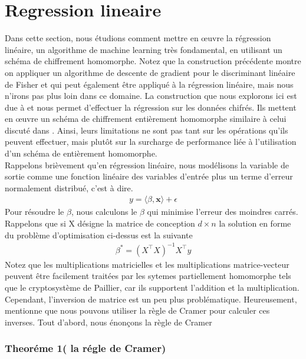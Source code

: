 \section{Regression lineaire}
Dans cette section, nous étudions comment mettre en œuvre la régression linéaire, un algorithme de machine learning  très fondamental, en utilisant un schéma de chiffrement homomorphe. Notez que la construction précédente montre  on appliquer un algorithme de descente de gradient pour le discriminant linéaire de Fisher et qui peut également être appliqué à la régression linéaire, mais nous n'irons pas plus loin dans ce domaine. La construction que nous explorons ici est due à \cite{23} et nous permet d'effectuer la régression sur les données chifrés. Ils mettent en œuvre un schéma de chiffrement entièrement homomorphe  similaire à celui discuté dans \cite{24}. Ainsi, leurs limitations ne sont pas tant sur les opérations qu'ils peuvent effectuer, mais plutôt sur la surcharge de performance liée à l'utilisation d'un schéma de entièrement homomorphe.\\
Rappelons brièvement qu'en régression linéaire, nous modélisons la variable de sortie comme une fonction linéaire des variables d'entrée plus un terme d'erreur normalement distribué, c'est à dire.
\begin{align}
  y= \langle \beta , \mathbf{x} \rangle +\epsilon
\end{align}
Pour résoudre le $\beta$, nous calculons le $\beta$ qui minimise l'erreur des moindres carrés. Rappelons que si X désigne la matrice de conception $ d \times n$ la solution en forme  du problème d'optimisation ci-dessus est la suivante
\begin{align}
  \beta^{*}=(X^\intercal X)^{-1}X^\intercal y
\end{align}
Notez que les multiplications matricielles et les multiplications matrice-vecteur peuvent être facilement traitées par les sytemes partiellement homomorphe tels que le cryptosystème de Paillier, car ils supportent l'addition et la multiplication. Cependant, l'inversion de matrice est un peu plus problématique. Heureusement, \cite{23} mentionne que nous pouvons utiliser la règle de Cramer pour calculer ces inverses. Tout d'abord, nous énonçons la règle de Cramer
\subsubsection{Theoréme 1( la régle de Cramer)}
